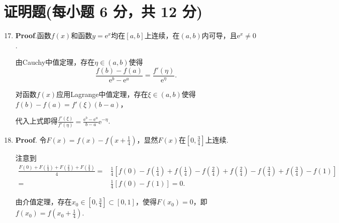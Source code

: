 \documentclass[../Main.tex]{subfiles}
\begin{document}
\section{证明题(每小题 6 分，共 12 分)}
\begin{enumerate}
    \setcounter{enumi}{16}
    \item \textbf{Proof}.函数$f(x)$和函数$y=\mathrm{e}^{x}$均在$[a,b]$上连续，在$(
              a,b)$内可导，且$\mathrm{e}^{x}\neq0$.

          由Cauchy中值定理，存在$\eta\in(a,b)$使得
          \[
              \frac{f(b)-f(a)}{\mathrm{e}^{b}-\mathrm{e}^{a}}=\frac{f'(\eta)}{\mathrm{e}^{\eta}}
              .
          \]

          对函数$f(x)$应用Lagrange中值定理，存在$\xi\in(a,b)$使得$f(b)-f(a)=f'(\xi)(b
              -a)$，

          代入上式即得$\frac{f'(\xi)}{f'(\eta)}=\frac{\mathrm{e}^{b}-\mathrm{e}^{a}}{b-a}
              \mathrm{e}^{-\eta}$.

    \item \textbf{Proof}. 令$F(x)=f(x)-f\left(x+\frac{1}{4}\right)$，显然$F(
              x)$在$\left[0,\frac{3}{4}\right]$上连续.

          注意到
          \[
              \begin{aligned}
                  \frac{F(0)+F\left(\frac{1}{4}\right)+F\left(\frac{2}{4}\right)+F\left(\frac{3}{4}\right)}{4}= & \frac{1}{4}\left[f(0)-f\left(\frac{1}{4}\right)+f\left(\frac{1}{4}\right)-f\left(\frac{2}{4}\right)+f\left(\frac{2}{4}\right)-f\left(\frac{3}{4}\right)+f\left(\frac{3}{4}\right)-f(1)\right] \\
                  =                                                                                             & \frac{1}{4}\left[f(0)-f(1)\right]=0.
              \end{aligned}
          \]

          由介值定理，存在$x_{0}\in\left[0,\frac{3}{4}\right]\subset[0,1]$，使得$F(x_{0}
              )=0$，即$f(x_{0})=f\left(x_{0}+\frac{1}{4}\right)$.
\end{enumerate}
\end{document}
